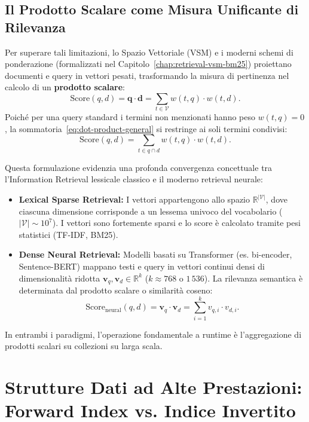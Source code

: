 \subsection{Il Prodotto Scalare come Misura Unificante di Rilevanza}
Per superare tali limitazioni, lo Spazio Vettoriale (VSM) e i moderni schemi di ponderazione (formalizzati nel Capitolo~\ref{chap:retrieval-vsm-bm25}) proiettano documenti e query in vettori pesati, trasformando la misura di pertinenza nel calcolo di un \textbf{prodotto scalare}:
\begin{equation}
\text{Score}(q, d) = \mathbf{q} \cdot \mathbf{d} = \sum_{t \in \mathcal{V}} w(t, q) \cdot w(t, d).
\label{eq:dot-product-general}
\end{equation}
Poich\'e per una query standard i termini non menzionati hanno peso $w(t, q) = 0$, la sommatoria~\eqref{eq:dot-product-general} si restringe ai soli termini condivisi:
\begin{equation}
\text{Score}(q, d) = \sum_{t \in q \cap d} w(t, q) \cdot w(t, d).
\label{eq:dot-product-intersection}
\end{equation}

Questa formulazione evidenzia una profonda convergenza concettuale tra l'Information Retrieval lessicale classico e il moderno retrieval neurale:
\begin{itemize}
    \item \textbf{Lexical Sparse Retrieval:} I vettori appartengono allo spazio $\mathbb{R}^{|\mathcal{V}|}$, dove ciascuna dimensione corrisponde a un lessema univoco del vocabolario ($|\mathcal{V}| \sim 10^7$). I vettori sono fortemente sparsi e lo score \`e calcolato tramite pesi statistici (TF-IDF, BM25).
    \item \textbf{Dense Neural Retrieval:} Modelli basati su Transformer (es. bi-encoder, Sentence-BERT) mappano testi e query in vettori continui densi di dimensionalit\`a ridotta $\mathbf{v}_q, \mathbf{v}_d \in \mathbb{R}^k$ ($k \approx 768 \text{ o } 1\,536$). La rilevanza semantica \`e determinata dal prodotto scalare o similarit\`a coseno:
    \begin{equation}
    \text{Score}_{\text{neural}}(q, d) = \mathbf{v}_q \cdot \mathbf{v}_d = \sum_{i=1}^{k} v_{q,i} \cdot v_{d,i}.
    \end{equation}
\end{itemize}
In entrambi i paradigmi, l'operazione fondamentale a runtime \`e l'aggregazione di prodotti scalari su collezioni su larga scala.

\FloatBarrier
\section{Strutture Dati ad Alte Prestazioni: Forward Index vs. Indice Invertito}
\label{sec:forward-vs-inverted}

